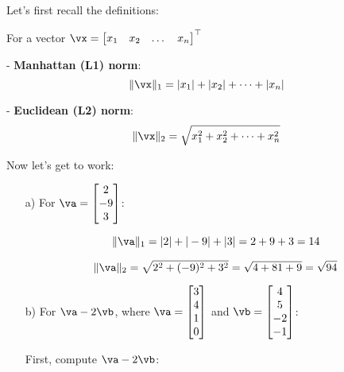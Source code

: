 \begin{sol}
   Let's first recall the definitions:

    For a vector $\vx = \begin{bmatrix} x_1 & x_2 & \dots & x_n \end{bmatrix}^\top$

    - \textbf{Manhattan (L1) norm}: 
      \[
      \|\vx\|_1 = |x_1| + |x_2| + \dots + |x_n|
      \]
      
    - \textbf{Euclidean (L2) norm}: 
      \[
      \|\vx\|_2 = \sqrt{x_1^2 + x_2^2 + \dots + x_n^2}
      \]
      
    Now let's get to work:

    \begin{enumerate}
        \item[a)] For $\va= \begin{bmatrix} 2 \\ -9 \\ 3 \end{bmatrix}$:
        
        \[
        \|\va\|_1 = |2| + |-9| + |3| = 2 + 9 + 3 = 14
        \]
        
        \[
        \|\va\|_2 = \sqrt{2^2 + (-9)^2 + 3^2} = \sqrt{4 + 81 + 9} = \sqrt{94}
        \]
        
        \item[b)] For $\va - 2\vb$, where $\va= \begin{bmatrix} 3 \\ 4 \\ 1 \\ 0 \end{bmatrix}$ and $\vb = \begin{bmatrix} 4 \\ 5 \\ -2 \\ -1 \end{bmatrix}$:
        
        First, compute $\va - 2\vb$:
        

\end{enumerate}
\end{sol}

